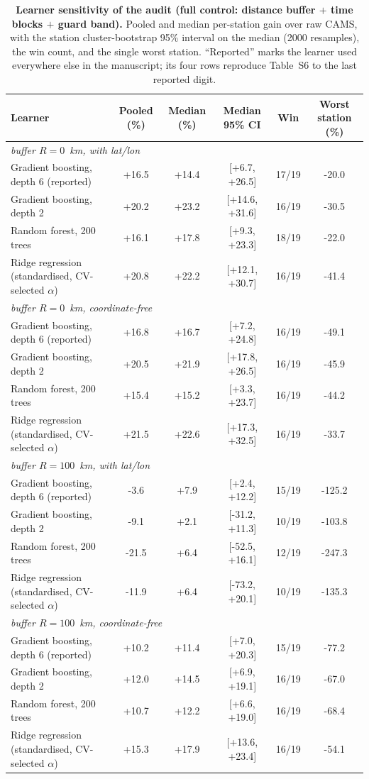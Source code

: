 \documentclass[11pt]{article}
\begin{document}
\begin{table}[htbp]\centering\footnotesize
\caption{\textbf{Learner sensitivity of the audit (full control: distance buffer $+$ time blocks $+$ guard band).} Pooled and median per-station gain over raw CAMS, with the station cluster-bootstrap 95\% interval on the median (2000 resamples), the win count, and the single worst station. ``Reported'' marks the learner used everywhere else in the manuscript; its four rows reproduce Table~S6 to the last reported digit.}
\begin{tabular}{lccccc}\toprule
Learner & Pooled (\%) & Median (\%) & Median 95\% CI & Win & Worst station (\%) \\ \midrule
\multicolumn{6}{l}{\textit{buffer $R=0$~km, with lat/lon}} \\
Gradient boosting, depth 6 (reported) & +16.5 & +14.4 & [+6.7, +26.5] & 17/19 & -20.0 \\
Gradient boosting, depth 2 & +20.2 & +23.2 & [+14.6, +31.6] & 16/19 & -30.5 \\
Random forest, 200 trees & +16.1 & +17.8 & [+9.3, +23.3] & 18/19 & -22.0 \\
Ridge regression (standardised, CV-selected $\alpha$) & +20.8 & +22.2 & [+12.1, +30.7] & 16/19 & -41.4 \\
\multicolumn{6}{l}{\textit{buffer $R=0$~km, coordinate-free}} \\
Gradient boosting, depth 6 (reported) & +16.8 & +16.7 & [+7.2, +24.8] & 16/19 & -49.1 \\
Gradient boosting, depth 2 & +20.5 & +21.9 & [+17.8, +26.5] & 16/19 & -45.9 \\
Random forest, 200 trees & +15.4 & +15.2 & [+3.3, +23.7] & 16/19 & -44.2 \\
Ridge regression (standardised, CV-selected $\alpha$) & +21.5 & +22.6 & [+17.3, +32.5] & 16/19 & -33.7 \\
\multicolumn{6}{l}{\textit{buffer $R=100$~km, with lat/lon}} \\
Gradient boosting, depth 6 (reported) & -3.6 & +7.9 & [+2.4, +12.2] & 15/19 & -125.2 \\
Gradient boosting, depth 2 & -9.1 & +2.1 & [-31.2, +11.3] & 10/19 & -103.8 \\
Random forest, 200 trees & -21.5 & +6.4 & [-52.5, +16.1] & 12/19 & -247.3 \\
Ridge regression (standardised, CV-selected $\alpha$) & -11.9 & +6.4 & [-73.2, +20.1] & 10/19 & -135.3 \\
\multicolumn{6}{l}{\textit{buffer $R=100$~km, coordinate-free}} \\
Gradient boosting, depth 6 (reported) & +10.2 & +11.4 & [+7.0, +20.3] & 15/19 & -77.2 \\
Gradient boosting, depth 2 & +12.0 & +14.5 & [+6.9, +19.1] & 16/19 & -67.0 \\
Random forest, 200 trees & +10.7 & +12.2 & [+6.6, +19.0] & 16/19 & -68.4 \\
Ridge regression (standardised, CV-selected $\alpha$) & +15.3 & +17.9 & [+13.6, +23.4] & 16/19 & -54.1 \\
\bottomrule\end{tabular}\end{table}
\end{document}
